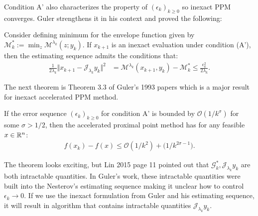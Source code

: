 \documentclass[12pt]{article}
\begin{document}
    Condition A' also characterizes the property of $(\epsilon_k)_{k\ge 0}$ so inexact PPM converges. 
    Guler strengthens it in his context and proved the following: 
    \begin{theorem}
        Consider defining minimum for the envelope function given by $\mathcal M_k^* := \min_z \mathcal {M}^{\lambda_k}(z; y_k)$. 
        If $x_{k +1}$ is an inexact evaluation under condition (A'), then the estimating sequence admits the conditions that: 
        \begin{align*}
            \frac{1}{2\lambda_k} \Vert x_{k + 1} - \mathcal J_{\lambda_k} y_k\Vert^2
            &= 
            \mathcal M^{\lambda_k}(x_{k + 1}, y_k) - \mathcal M^*_k
            \le \frac{\epsilon_k^2}{2\lambda_k}. 
        \end{align*}
    \end{theorem}
    The next theorem is Theorem 3.3 of Guler's 1993 papers which is a major result for inexact accelerated PPM method. 
    \begin{theorem}
        If the error sequence $(\epsilon_k)_{k \ge0}$ for condition A' is bounded by $\mathcal O(1/k^\sigma)$ for some $\sigma > 1/2$, then the accelerated proximal point method has for any feasible $x \in \mathbb R^n$: 
        \begin{align*}
            f(x_k) - f(x) \le \mathcal O(1/k^2) + \mathcal (1 / k^{2\sigma - 1}). 
        \end{align*}    
    \end{theorem}
    The theorem looks exciting, but Lin 2015 \cite{lin_universal_2015} page 11 pointed out that $\mathcal G_k^*, \mathcal J_{\lambda_k} y_k$ are both intractable quantities. 
    In Guler's work, these intractable quantities were built into the Nesterov's estimating sequence making it unclear how to control $\epsilon_k \rightarrow 0$. 
    If we use the inexact formulation from Guler and his estimating sequence, it will result in algorithm that contains intractable quantities $\mathcal J_{\lambda_k} y_k$. 
    
\end{document}
